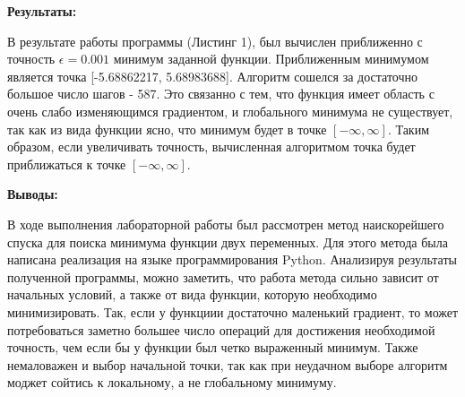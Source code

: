 \documentclass [12pt]{article}
\begin{document}
\textbf{Результаты:}

В результате работы программы (Листинг 1), был вычислен приближенно с точность $\epsilon = 0.001$ минимум заданной функции. Приближенным минимумом является точка [-5.68862217,  5.68983688]. Алгоритм сошелся за достаточно большое число шагов - 587. Это связанно с тем, что функция имеет область с очень слабо изменяющимся градиентом, и глобального минимума не существует, так как из вида функции ясно, что минимум будет в точке $[-\infty, \infty]$.
Таким образом, если увеличивать точность, вычисленная алгоритмом точка будет приближаться к точке $[-\infty, \infty]$.

\textbf{Выводы:}

В ходе выполнения лабораторной работы был рассмотрен метод наискорейшего спуска для поиска минимума функции двух переменных. Для этого метода была написана реализация на языке программирования Python. Анализируя результаты полученной программы, можно заметить, что работа метода сильно зависит от начальных условий, а также от вида функции, которую необходимо минимизировать. Так, если у функциии достаточно маленький градиент, то может потребоваться заметно большее число операций для достижения необходимой точность, чем если бы у функции был четко выраженный минимум. Также немаловажен и выбор начальной точки, так как при неудачном выборе алгоритм моджет сойтись к локальному, а не глобальному минимуму.
\end{document}
